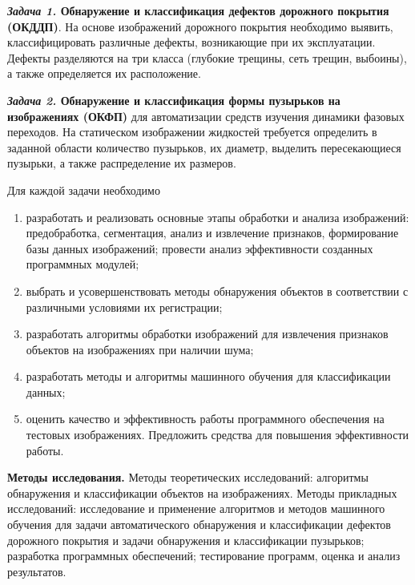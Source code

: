 \noindent\textbf{\textit{Задача 1.} Обнаружение и классификация дефектов дорожного покрытия (ОКДДП)}. На основе изображений дорожного покрытия необходимо выявить, классифицировать различные дефекты, возникающие при их эксплуатации.  Дефекты разделяются на три класса (глубокие трещины, сеть трещин, выбоины), а также определяется их расположение.\vspace{0.5em}

\noindent\textbf{\textit{Задача 2.} Обнаружение и классификация формы пузырьков на изображениях (ОКФП)} для автоматизации средств изучения динамики фазовых переходов.  На статическом изображении жидкостей требуется определить в заданной области количество пузырьков, их диаметр, выделить пересекающиеся пузырьки, а также распределение их размеров.\vspace{0.5em}

Для каждой задачи необходимо
\begin{enumerate}
\item разработать и реализовать основные этапы обработки и анализа изображений: предобработка, сегментация, анализ и извлечение признаков, формирование базы данных изображений; провести анализ эффективности созданных программных модулей;
\item выбрать и усовершенствовать методы обнаружения объектов в соответствии с различными условиями их регистрации;
\item разработать алгоритмы обработки изображений для извлечения признаков объектов на изображениях при наличии шума;
\item разработать методы и алгоритмы машинного обучения для классификации данных;
\item оценить качество и эффективность работы программного обеспечения на тестовых изображениях. Предложить средства для повышения эффективности работы.
\end{enumerate}

\textbf{Методы исследования.} Методы теоретических исследований: алгоритмы обнаружения и классификации объектов на изображениях. Методы прикладных исследований: исследование и применение алгоритмов и методов машинного обучения для задачи автоматического обнаружения и классификации дефектов дорожного покрытия и задачи обнаружения и классификации пузырьков; разработка программных обеспечений; тестирование программ, оценка и анализ результатов.

